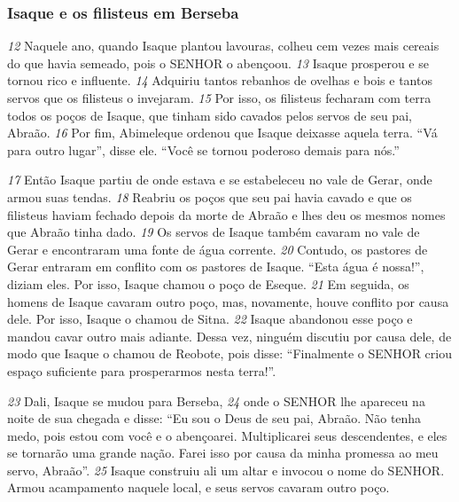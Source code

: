 \subsubsection*{Isaque e os filisteus em Berseba}
\textit{\tiny 12}
Naquele ano, quando Isaque plantou lavouras, colheu cem vezes mais cereais do
que havia semeado, pois o SENHOR o abençoou. 
\textit{\tiny 13}
Isaque prosperou e se tornou
rico e influente. 
\textit{\tiny 14}
Adquiriu tantos rebanhos de ovelhas e bois e tantos servos que
os filisteus o invejaram. 
\textit{\tiny 15}
Por isso, os filisteus fecharam com terra todos os poços
de Isaque, que tinham sido cavados pelos servos de seu pai, Abraão.
\textit{\tiny 16}
Por fim, Abimeleque ordenou que Isaque deixasse aquela terra. “Vá para
outro lugar”, disse ele. “Você se tornou poderoso demais para nós.”
   
\bigskip   
\textit{\tiny 17}
Então Isaque partiu de onde estava e se estabeleceu no vale de Gerar, onde
armou suas tendas. 
\textit{\tiny 18}
Reabriu os poços que seu pai havia cavado e que os filisteus
haviam fechado depois da morte de Abraão e lhes deu os mesmos nomes que
Abraão tinha dado.
\textit{\tiny 19}
Os servos de Isaque também cavaram no vale de Gerar e encontraram uma
fonte de água corrente. 
\textit{\tiny 20}
Contudo, os pastores de Gerar entraram em conflito
com os pastores de Isaque. “Esta água é nossa!”, diziam eles. Por isso, Isaque
chamou o poço de Eseque. 
\textit{\tiny 21}
Em seguida, os homens de Isaque cavaram outro
poço, mas, novamente, houve conflito por causa dele. Por isso, Isaque o chamou
de Sitna. 
\textit{\tiny 22}
Isaque abandonou esse poço e mandou cavar outro mais adiante.
Dessa vez, ninguém discutiu por causa dele, de modo que Isaque o chamou de
Reobote, pois disse: “Finalmente o SENHOR criou espaço suficiente para
prosperarmos nesta terra!”.
   
\bigskip   
\textit{\tiny 23}
Dali, Isaque se mudou para Berseba, 
\textit{\tiny 24}
onde o SENHOR lhe apareceu na noite
de sua chegada e disse: “Eu sou o Deus de seu pai, Abraão. Não tenha medo, pois
estou com você e o abençoarei. Multiplicarei seus descendentes, e eles se tornarão
uma grande nação. Farei isso por causa da minha promessa ao meu servo,
Abraão”. 
\textit{\tiny 25}
Isaque construiu ali um altar e invocou o nome do SENHOR. Armou
acampamento naquele local, e seus servos cavaram outro poço.

